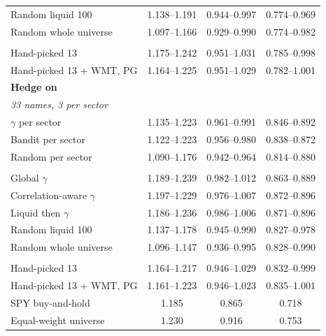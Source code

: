 \begin{table}[H]
\begin{tabular}{lccc}
Random liquid 100 & 1.138--1.191 & 0.944--0.997 & 0.774--0.969 \\
Random whole universe & 1.097--1.166 & 0.929--0.990 & 0.774--0.982 \\
\addlinespace
\multicolumn{4}{l}{\emph{Hand-picked}} \\
Hand-picked 13 & 1.175--1.242 & 0.951--1.031 & 0.785--0.998 \\
Hand-picked 13 + WMT, PG & 1.164--1.225 & 0.951--1.029 & 0.782--1.001 \\
\midrule
\multicolumn{4}{l}{\textbf{Hedge on}} \\
\multicolumn{4}{l}{\emph{33 names, 3 per sector}} \\
$\gamma$ per sector & 1.135--1.223 & 0.961--0.991 & 0.846--0.892 \\
Bandit per sector & 1.122--1.223 & 0.956--0.980 & 0.838--0.872 \\
Random per sector & 1.090--1.176 & 0.942--0.964 & 0.814--0.880 \\
\addlinespace
\multicolumn{4}{l}{\emph{13 names}} \\
Global $\gamma$ & 1.189--1.239 & 0.982--1.012 & 0.863--0.889 \\
Correlation-aware $\gamma$ & 1.197--1.229 & 0.976--1.007 & 0.872--0.896 \\
Liquid then $\gamma$ & 1.186--1.236 & 0.986--1.006 & 0.871--0.896 \\
Random liquid 100 & 1.137--1.178 & 0.945--0.990 & 0.827--0.978 \\
Random whole universe & 1.096--1.147 & 0.936--0.995 & 0.828--0.990 \\
\addlinespace
\multicolumn{4}{l}{\emph{Hand-picked}} \\
Hand-picked 13 & 1.164--1.217 & 0.946--1.029 & 0.832--0.999 \\
Hand-picked 13 + WMT, PG & 1.161--1.223 & 0.946--1.023 & 0.835--1.001 \\
\midrule
SPY buy-and-hold & 1.185 & 0.865 & 0.718 \\
Equal-weight universe & 1.230 & 0.916 & 0.753 \\
\bottomrule
\end{tabular}
\end{table}
